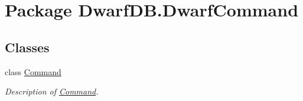 \hypertarget{namespace_dwarf_d_b_1_1_dwarf_command}{
\section{Package DwarfDB.DwarfCommand}
\label{namespace_dwarf_d_b_1_1_dwarf_command}
}
\subsection*{Classes}
\begin{DoxyCompactItemize}
\item 
class \hyperlink{class_dwarf_d_b_1_1_dwarf_command_1_1_command}{Command}
\begin{DoxyCompactList}\small\item\em Description of \hyperlink{class_dwarf_d_b_1_1_dwarf_command_1_1_command}{Command}. \item\end{DoxyCompactList}\end{DoxyCompactItemize}
